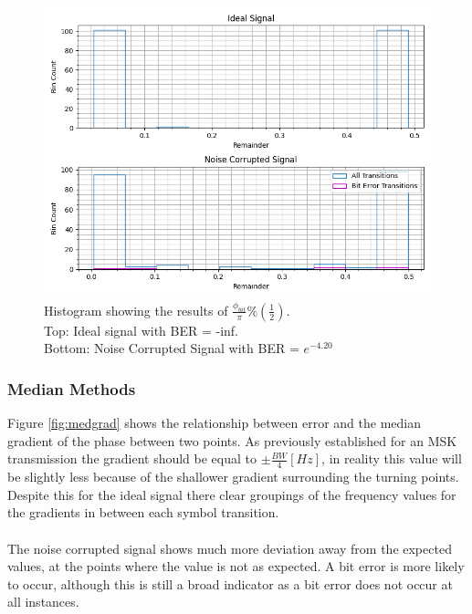 \begin{figure}[h!]
    \centering
    \includegraphics[width = \textwidth]{figs/error/phaseHist.png}
    \caption{\centering Histogram showing the results of $\frac{\phi_{bit}}{\pi} \%\left(\frac{1}{2}\right)$. \\ Top: Ideal signal with BER = -inf. \\ Bottom: Noise Corrupted Signal with BER = $e^{-4.20}$}
    \label{fig:phaseHist}
\end{figure}

\pagebreak
\subsubsection{Median Methods}
Figure \ref{fig:medgrad} shows the relationship between error and the median gradient of the phase between two points. As previously established for an MSK transmission the gradient should be equal to $\pm\frac{BW}{4}[Hz]$, in reality this value will be slightly less because of the shallower gradient surrounding the turning points. Despite this for the ideal signal there clear groupings of the frequency values for the gradients in between each symbol transition.
\\\\
The noise corrupted signal shows much more deviation away from the expected values, at the points where the value is not as expected. A bit error is more likely to occur, although this is still a broad indicator as a bit error does not occur at all instances. 

